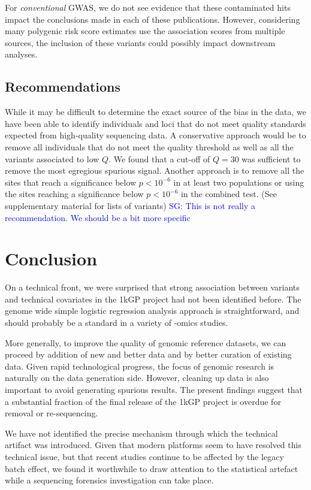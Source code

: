 \documentclass[9pt,lineno]{elife}
\newcommand{\sgcomment}[1]{\textcolor{blue}{SG: #1}}
\begin{document}
For \textit{conventional} GWAS, we do not see evidence that these contaminated hits impact the conclusions made in each of these publications.
However, considering many polygenic risk score estimates use the association scores from multiple sources, the inclusion of these variants could possibly impact downstream analyses.  

\subsection{Recommendations}
While it may be difficult to determine the exact source of the bias in the data, we have been able to identify individuals and loci that do not meet quality standards expected from high-quality sequencing data.
A conservative approach would be to remove all individuals that do not meet the quality threshold as well as all the variants associated to low $Q$.
We found that a cut-off of $Q = 30$ was sufficient to remove the most egregious spurious signal.
Another approach is to remove all the sites that reach a significance below $ p < 10^{-6}$ in at least two populations or using the sites reaching a significance below $ p < 10^{-6}$ in the combined test. (See supplementary material for lists of variants) \sgcomment{This is not really a recommendation. We should be a bit more specific}

\section{Conclusion}

On a technical front, we were surprised that strong association between variants and technical covariates in the 1kGP project had not been identified before. 
The genome wide simple logistic regression analysis approach is straightforward, and should probably be a standard in a variety of -omics studies. 

More generally, to improve the quality of genomic reference datasets, we can proceed by addition of new and better data and by better curation of existing data.
Given rapid technological progress, the focus of genomic research is naturally on the data generation side. 
However, cleaning up data is also important to avoid generating spurious results. 
The present findings suggest that a substantial fraction of the final release of the 1kGP project is overdue for removal or re-sequencing.

We have not identified the precise mechanism through which the technical artifact was introduced. Given that modern platforms seem to have resolved this technical issue, but that recent studies continue to be affected by the legacy batch effect, we found it worthwhile to draw attention to the statistical artefact while a sequencing forensics investigation can take place. 
\end{document}
